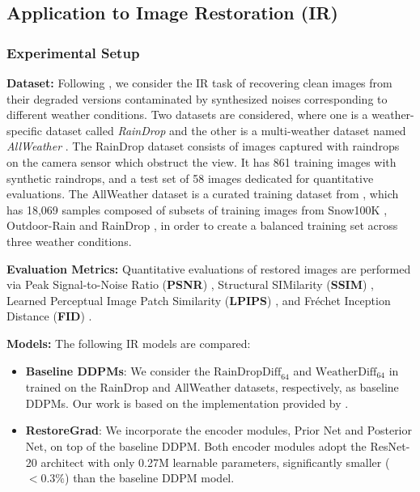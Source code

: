 \subsection{Application to Image Restoration (IR)}
\label{sec: ir on weathers}

\subsubsection{Experimental Setup}

\noindent\textbf{Dataset:} Following \citet{ozdenizci2023restoring}, we consider the IR task of recovering clean images from their degraded versions contaminated by synthesized noises corresponding to different weather conditions. Two datasets are considered, where one is a weather-specific dataset called \textit{RainDrop} \citep{qian2018attentive} and the other is a multi-weather dataset named \textit{AllWeather} \citep{valanarasu2022transweather}. The RainDrop dataset consists of images captured with raindrops on the camera sensor which obstruct the view. It has 861 training images with synthetic raindrops, and a test set of 58 images dedicated for quantitative evaluations. The AllWeather dataset is a curated training dataset from \citet{valanarasu2022transweather}, which has 18,069 samples composed of subsets of training images from Snow100K \citep{liu2018desnownet}, Outdoor-Rain \citep{li2019heavy} and RainDrop \citep{qian2018attentive}, in order to create a balanced training set across three weather conditions. 

\noindent\textbf{Evaluation Metrics:} Quantitative evaluations of restored images are performed via Peak Signal-to-Noise Ratio (\textbf{PSNR}) \citep{huynh2008scope}, Structural SIMilarity (\textbf{SSIM}) \citep{wang2004image}, %
Learned Perceptual Image Patch Similarity (\textbf{LPIPS}) \citep{zhang2018unreasonable}, and Fréchet Inception Distance (\textbf{FID}) \citep{heusel2017gans}.

\noindent\textbf{Models:} The following IR models are compared:
\begin{itemize}[leftmargin=*]
\vspace{-0.15cm}
    \item \textbf{Baseline DDPMs}: We consider the $\text{RainDropDiff}_{64}$ and $\text{WeatherDiff}_{64}$ in \citet{ozdenizci2023restoring} trained on the RainDrop and AllWeather datasets, respectively, as baseline DDPMs. Our work is based on the implementation provided by \citet{ozdenizci2023restoring}. 
    \vspace{-0.45cm}
    \item \textbf{RestoreGrad}: We incorporate the encoder modules, Prior Net and Posterior Net, on top of the baseline DDPM. Both encoder modules adopt the ResNet-20 architect \citep{he2016deep} with only 0.27M learnable parameters, significantly smaller ($<0.3\%$) than the baseline DDPM model.
\end{itemize}


